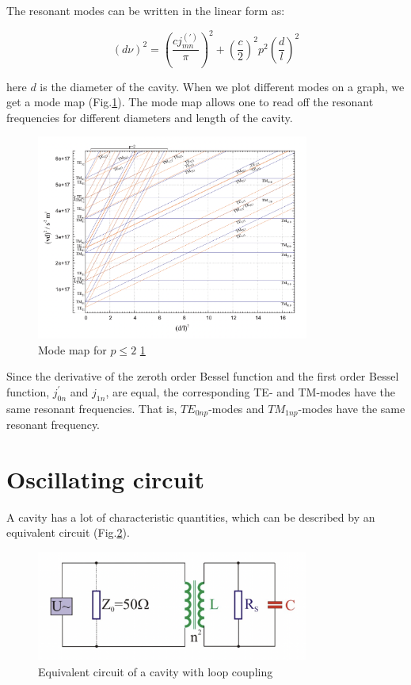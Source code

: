\documentclass[a4paper]{article}
\numberwithin{equation}{section}
\begin{document}
The resonant modes can be written in the linear form as:

\begin{equation}
		\left(d \nu \right)^2 = \left(\frac{cj_{mn}^{(')}}{\pi}\right)^2 + \left(\frac{c}{2}\right)^2 p^2 \left(\frac{d}{l}\right)^2
\end{equation}

here $d$ is the diameter of the cavity.
When we plot different modes on a graph, we get a mode map (Fig.\ref{fig:mode}). The mode map allows one to read off the resonant frequencies for different diameters and length of the cavity. 

\begin{figure}[htpb]
    \centering
    \includegraphics[width=0.8\textwidth]{mode_map}
    \caption{Mode map for $p \leq 2$ \ref{} }
    \label{fig:mode}
\end{figure}

Since the derivative of the zeroth order Bessel function and the first order Bessel function, $j^{'}_{0n}$ and $j_{1n}$, are equal, the corresponding TE- and TM-modes have the same resonant frequencies. That is, $TE_{0np}$-modes and $TM_{1np}$-modes have the same resonant frequency. 

\section{Oscillating circuit}
A cavity has a lot of characteristic quantities, which can be described by an equivalent circuit (Fig.\ref{fig:circuit}). 
\begin{figure}[htpb]
    \centering
    \includegraphics[width=0.8\textwidth]{circuit}
    \caption{Equivalent circuit of a cavity with loop coupling}
    \label{fig:circuit}
\end{figure}	
\end{document}
